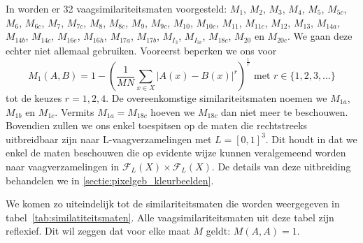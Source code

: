 In \cite{vanderweken:similariteitsmaten} worden er 32 vaagsimilariteitsmaten voorgesteld: $M_1$, $M_2$,
$M_3$, $M_4$, $M_5$, $M_{5c}$, $M_6$, $M_{6c}$, $M_7$, $M_{7c}$, $M_8$, $M_{8c}$, $M_9$, $M_{9c}$,
$M_{10}$, $M_{10c}$, $M_{11}$, $M_{11c}$, $M_{12}$, $M_{13}$, $M_{14a}$, $M_{14b}$, $M_{14c}$, 
$M_{16e}$, $M_{16h}$, $M_{17a}$, $M_{17b}$, $M_{I_3}$, $M_{I_{3c}}$, $M_{18c}$, $M_{20}$ en $M_{20c}$.
We gaan deze echter niet allemaal gebruiken. Vooreerst beperken we ons voor
$$
M_1(A,B) = 1 - \left(\frac{1}{M N} \sum_{x \in X} | A(x) - B(x)|^r\right)^\frac{1}{r} \textrm{ met } 
r \in \{1,2,3,\ldots\}
$$ tot de keuzes
$r=1,2,4$. De overeenkomstige similariteitsmaten noemen we $M_{1a}$, $M_{1b}$ en $M_{1c}$. Vermits
$M_{1a}=M_{18c}$ hoeven we $M_{18c}$ dan niet meer te beschouwen. Bovendien zullen we ons enkel
toespitsen op de maten die rechtstreeks uitbreidbaar zijn naar L-vaagverzamelingen met $L=[0,1]^3$. 
Dit houdt in dat we enkel de maten beschouwen die op evidente wijze kunnen veralgemeend worden naar
vaagverzamelingen in $\mathcal{F}_L(X) \times \mathcal{F}_L(X)$. De details van deze
uitbreiding behandelen we in \ref{sectie:pixelgeb_kleurbeelden}. 

We komen zo uiteindelijk tot
de similariteitsmaten die worden weergegeven in tabel~\ref{tab:similatiteitsmaten}. 
Alle vaagsimilariteitsmaten uit deze tabel zijn reflexief. Dit wil zeggen dat 
voor elke maat $M$ geldt: $M(A,A)=1$. 

